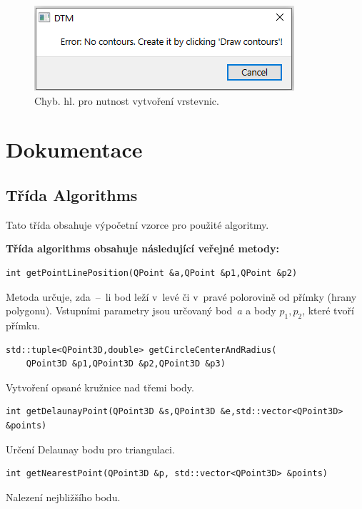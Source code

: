 \documentclass[a4paper, 12pt, oneside, titlepage]{article} %
\begin{document}
\begin{figure}[!htb]
	\centering
	\includegraphics[scale=0.7]{obrazky/no_contours.png} 
	\caption{Chyb. hl. pro nutnost vytvoření vrstevnic.
	}
	\label{fig:no_contours}
\end{figure} 
\FloatBarrier



\section{Dokumentace}
\subsection{Třída Algorithms}
Tato třída obsahuje výpočetní vzorce pro použité algoritmy.

\textbf{Třída algorithms obsahuje následující veřejné metody:}

\begin{verbatim}
int getPointLinePosition(QPoint &a,QPoint &p1,QPoint &p2)
\end{verbatim}
Metoda určuje, zda~--~li bod leží v~levé či v~pravé polorovině od přímky (hrany polygonu). Vstupními parametry jsou určovaný bod~$a$ a body $p_1, p_2$, které tvoří přímku.\\

\begin{verbatim}
std::tuple<QPoint3D,double> getCircleCenterAndRadius(
    QPoint3D &p1,QPoint3D &p2,QPoint3D &p3)
\end{verbatim}
Vytvoření opsané kružnice nad třemi body.\\

\begin{verbatim}
int getDelaunayPoint(QPoint3D &s,QPoint3D &e,std::vector<QPoint3D> &points)
\end{verbatim}
Určení Delaunay bodu pro triangulaci.\\

\begin{verbatim}
int getNearestPoint(QPoint3D &p, std::vector<QPoint3D> &points)
\end{verbatim}
Nalezení nejbližšího bodu.\\
\end{document}

